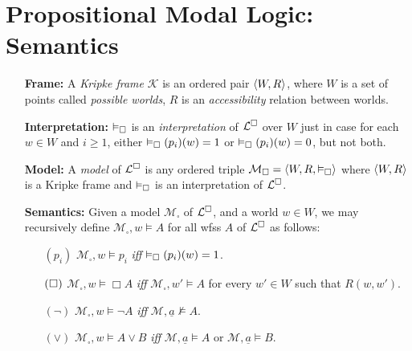 \documentclass[a4paper, 11pt]{article} %
\begin{document}
\section*{\sc Propositional Modal Logic: Semantics}

\begin{enumerate}[leftmargin=1.2in] %
	\item[\bf Frame:] A \textit{Kripke frame} $\mathcal{K}$ is an ordered pair $\langle W,R\rangle$, where $W$ is a set of points called \textit{possible worlds}, $R$ is an \textit{accessibility} relation between worlds.
	\item[\bf Interpretation:] $\vDash_{\square}$ is an \textit{interpretation} of $\mathcal{L}^{\square}$ over $W$ just in case for each $w\in W$ and $i\geq1$, either $\vDash_{\square}(p_i)(w)=1$ or $\vDash_{\square}(p_i)(w)=0$, but not both.
	\item[\bf Model:] A \textit{model} of $\mathcal{L}^{\square}$ is any ordered triple $\mathcal{M}_\square=\langle W,R,\vDash_{\square}\rangle$ where $\langle W,R\rangle$ is a Kripke frame and $\vDash_{\square}$ is an interpretation of $\mathcal{L}^{\square}$.
	\item[\bf Semantics:] Given a model $\mathcal{M}_\square$ of $\mathcal{L}^{\square}$, and a world $w\in W$, we may recursively define $\mathcal{M}_\square,w\vDash A$ for all wfss $A$ of $\mathcal{L}^{\square}$ as follows:
	      \begin{small}
		      \begin{itemize}[leftmargin=.36in]
			      \item[$(p_i)$] $\mathcal{M}_\square,w\vDash  p_i$ \textit{iff} $\vDash_{\square}(p_i)(w)=1$.
			      \item[$(\hspace{.3pt}\Box\hspace{.3pt})$] $\mathcal{M}_\square,w\vDash  \Box A$ \textit{iff} $\mathcal{M}_\square,w'\vDash A$ for every $w'\in W$ such that $R(w,w')$.
			      \item[$(\neg)$] $\mathcal{M}_\square,w\vDash  \neg A$ \textit{iff} $\mathcal{M},\underline{a}\nvDash A$.
			      \item[$(\vee)$] $\mathcal{M}_\square,w\vDash  A\vee B$ \textit{iff} $\mathcal{M},\underline{a}\vDash  A$ or $\mathcal{M},\underline{a}\vDash  B$.

\end{itemize}
\end{small}
\end{enumerate}
\end{document}
